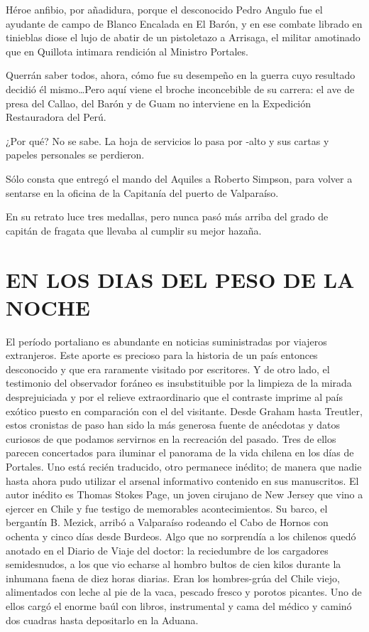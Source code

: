 \documentclass[10pt,twoside,openright]{memoir}
\begin{document}
Héroe anfibio, por añadidura, porque el desconocido Pedro Angulo fue el
ayudante de campo de Blanco Encalada en El Barón, y en ese combate
librado en tinieblas diose el lujo de abatir de un pistoletazo a
Arrisaga, el militar amotinado que en Quillota intimara rendición al
Ministro Portales.

Querrán saber todos, ahora, cómo fue su desempeño en la guerra cuyo
resultado decidió él mismo\ldots Pero aquí viene el broche inconcebible de
su carrera: el ave de presa del Callao, del Barón y de Guam no
interviene en la Expedición Restauradora del Perú.

¿Por qué? No se sabe. La hoja de servicios lo pasa por -alto y sus
cartas y papeles personales se perdieron.

Sólo consta que entregó el mando del Aquiles a Roberto Simpson, para
volver a sentarse en la oficina de la Capitanía del puerto de
Valparaíso.

En su retrato luce tres medallas, pero nunca pasó más arriba del grado
de capitán de fragata que llevaba al cumplir su mejor hazaña.

\chapter{EN LOS DIAS DEL PESO DE LA NOCHE}

El período portaliano es abundante en noticias suministradas por
viajeros extranjeros. Este aporte es precioso para la historia de un
país entonces desconocido y que era raramente visitado por escritores. Y
de otro lado, el testimonio del observador foráneo es insubstituible por
la limpieza de la mirada desprejuiciada y por el relieve extraordinario
que el contraste imprime al país exótico puesto en comparación con el
del visitante. Desde Graham hasta Treutler, estos cronistas de paso han
sido la más generosa fuente de anécdotas y datos curiosos de que podamos
servirnos en la recreación del pasado. Tres de ellos parecen concertados
para iluminar el panorama de la vida chilena en los días de Portales.
Uno está recién traducido, otro permanece inédito; de manera que nadie
hasta ahora pudo utilizar el arsenal informativo contenido en sus
manuscritos. El autor inédito es Thomas Stokes Page, un joven cirujano
de New Jersey que vino a ejercer en Chile y fue testigo de memorables
acontecimientos. Su barco, el bergantín B. Mezick, arribó a Valparaíso
rodeando el Cabo de Hornos con ochenta y cinco días desde Burdeos. Algo
que no sorprendía a los chilenos quedó anotado en el Diario de Viaje del
doctor: la reciedumbre de los cargadores semidesnudos, a los que vio
echarse al hombro bultos de cien kilos durante la inhumana faena de diez
horas diarias. Eran los hombres-grúa del Chile viejo, alimentados con
leche al pie de la vaca, pescado fresco y porotos picantes. Uno de ellos
cargó el enorme baúl con libros, instrumental y cama del médico y caminó
dos cuadras hasta depositarlo en la Aduana.
\end{document}
